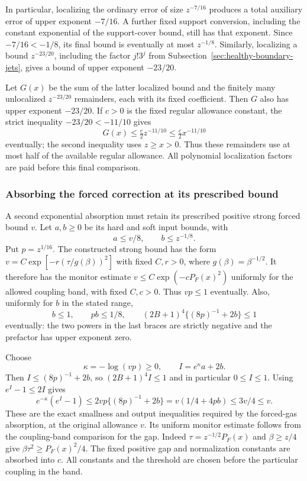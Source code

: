 In particular, localizing the ordinary error of size $z^{-7/16}$
produces a total auxiliary error of upper exponent $-7/16$. A further
fixed support conversion, including the constant exponential of the
support-cover bound, still has that exponent. Since
$-7/16<-1/8$, its final bound is eventually at most $z^{-1/8}$.
Similarly, localizing a bound $z^{-23/20}$, including the factor
$j!3^j$ from Subsection~\ref{sec:healthy-boundary-jets}, gives a bound
of upper exponent $-23/20$.

Let $G(x)$ be the sum of the latter localized bound and the finitely
many unlocalized $z^{-23/20}$ remainders, each with its fixed
coefficient. Then $G$ also has upper exponent $-23/20$. If $c>0$
is the fixed regular allowance constant, the strict inequality
$-23/20<-11/10$ gives
\[
                   G(x)\le\tfrac c2 z^{-11/10}
                             \le\tfrac c2 x^{-11/10}
\]
eventually; the second inequality uses $z\ge x>0$. Thus these
remainders use at most half of the available regular allowance.
All polynomial localization factors are paid before this final
comparison.

\subsubsection{Absorbing the forced correction at its prescribed bound}
A second exponential absorption must retain its prescribed positive
strong forced bound $v$. Let $a,b\ge0$ be its hard and soft input bounds, with
\[
                       a\le v/8,\qquad b\le z^{-1/8}.
\]
Put $p=z^{1/16}$. The constructed strong bound has the form
$v=C\exp[-r(\tau/g(\beta))^2]$ with fixed $C,r>0$, where
$g(\beta)=\beta^{-1/2}$. It therefore has the monitor estimate
$v\le C\exp(-cP_F(x)^2)$ uniformly for the allowed coupling band,
with fixed $C,c>0$. Thus $vp\le1$ eventually. Also, uniformly for
$b$ in the stated range,
\[
 b\le1,\qquad pb\le1/8,\qquad
        (2B+1)^4\{(8p)^{-1}+2b\}\le1
\]
eventually: the two powers in the last braces are strictly negative
and the prefactor has upper exponent zero.

Choose
\[
                \kappa=-\log(vp)\ge0,
                   \qquad I=e^\kappa a+2b.
\]
Then $I\le(8p)^{-1}+2b$, so $(2B+1)^4I\le1$ and in particular
$0\le I\le1$. Using $e^I-1\le2I$ gives
\[
 e^{-\kappa}(e^I-1)
   \le 2vp\{(8p)^{-1}+2b\}
   =v(1/4+4pb)\le3v/4\le v.
\]
These are the exact smallness and output inequalities required by
the forced-gas absorption, at the original allowance $v$. Its
uniform monitor estimate follows from the coupling-band comparison
for the gap. Indeed $\tau=z^{-1/2}P_F(x)$ and $\beta\ge z/4$ give
$\beta\tau^2\ge P_F(x)^2/4$. The fixed positive gap and normalization
constants are absorbed into $c$. All constants and the threshold are
chosen before the particular coupling in the band.

